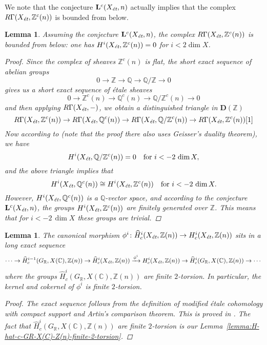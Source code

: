 \documentclass{article}
\newcommand{\CC}{\mathbb{C}}
\newcommand{\QQ}{\mathbb{Q}}
\newcommand{\RR}{\mathbb{R}}
\newcommand{\ZZ}{\mathbb{Z}}
\newcommand{\et}{\text{\it ét}}
\newtheorem{lemma}[theorem]{Lemma}
\theoremstyle{definition}
\numberwithin{equation}{section}
\begin{document}
We note that the conjecture $\mathbf{L}^c (X_\et, n)$ actually implies that the
complex $R\Gamma (X_\et, \ZZ^c (n))$ is bounded from below.

\begin{lemma}
  \label{lemma:RGamma(Xet,Zc(n))-bounded-from-below}
  Assuming the conjecture $\mathbf{L}^c (X_\et, n)$, the complex
  $R\Gamma (X_\et, \ZZ^c (n))$ is bounded from below:
  one has $H^i (X_\et, \ZZ^c (n)) = 0$ for $i < 2\dim X$.

  \begin{proof}
    Since the complex of sheaves $\ZZ^c (n)$ is flat, the short exact sequence of
    abelian groups
    $$0 \to \ZZ \to \QQ \to \QQ/\ZZ \to 0$$
    gives us a short exact sequence of étale sheaves
    $$0 \to \ZZ^c (n) \to \QQ^c (n) \to \QQ/\ZZ^c (n) \to 0$$
    and then applying $R\Gamma (X_\et, -)$, we obtain a distinguished
    triangle in $\mathbf{D} (\ZZ)$
    \[ R\Gamma (X_\et, \ZZ^c (n)) \to
    R\Gamma (X_\et, \QQ^c (n)) \to
    R\Gamma (X_\et, \QQ/\ZZ^c (n)) \to
    R\Gamma (X_\et, \ZZ^c (n)) [1] \]
    Now according to \cite[Lemma~5.12]{Morin-2014} (note that the proof there
    also uses Geisser's duality theorem), we have
    $$H^i (X_\et, \QQ/\ZZ^c (n)) = 0 \quad\text{for }i < -2\,\dim X,$$
    and the above triangle implies that
    \[ H^i (X_\et, \QQ^c (n)) \cong
    H^i (X_\et, \ZZ^c (n)) \quad\text{for }i < -2\,\dim X. \]
    However, $H^i (X_\et, \QQ^c (n))$ is a $\QQ$-vector space, and
    according to the conjecture $\mathbf{L}^c (X_\et, n)$, the groups
    $H^i (X_\et, \ZZ^c (n))$ are finitely generated over $\ZZ$. This
    means that for $i < -2\,\dim X$ these groups are trivial.
  \end{proof}
\end{lemma}

\begin{lemma}
  \label{lemma:morphism-hat-Hc(Xet,Z(n))->Hc(Xet,Z(n))}
  The canonical morphism
  $\phi^i\colon \widehat{H}^i_c (X_\et, \ZZ (n)) \to H^i_c (X_\et, \ZZ (n))$
  sits in a long exact sequence
  \[ \cdots \to \widehat{H}^{i-1}_c (G_\RR, X (\CC), \ZZ (n)) \to
  \widehat{H}_c^i (X_\et, \ZZ(n)) \xrightarrow{\phi^i}
  H_c^i (X_\et, \ZZ(n)) \to
  \widehat{H}^i_c (G_\RR, X (\CC), \ZZ (n)) \to \cdots \]
  where the groups $\widehat{H}^i_c (G_\RR, X (\CC), \ZZ (n))$ are finite
  $2$-torsion.  In particular, the kernel and cokernel of
  $\phi^i$ is finite $2$-torsion.

  \begin{proof}
    The exact sequence follows from the definition of modified étale cohomology
    with compact support and Artin's comparison theorem. This is proved in
    \cite[Lemma~6.14]{Flach-Morin-2018}.
    The fact that $\widehat{H}^i_c (G_\RR, X (\CC), \ZZ (n))$ are finite
    $2$-torsion is our Lemma~\ref{lemma:H-hat-c-GR-X(C)-Z(n)-finite-2-torsion}.
  \end{proof}
\end{lemma}
\end{document}

